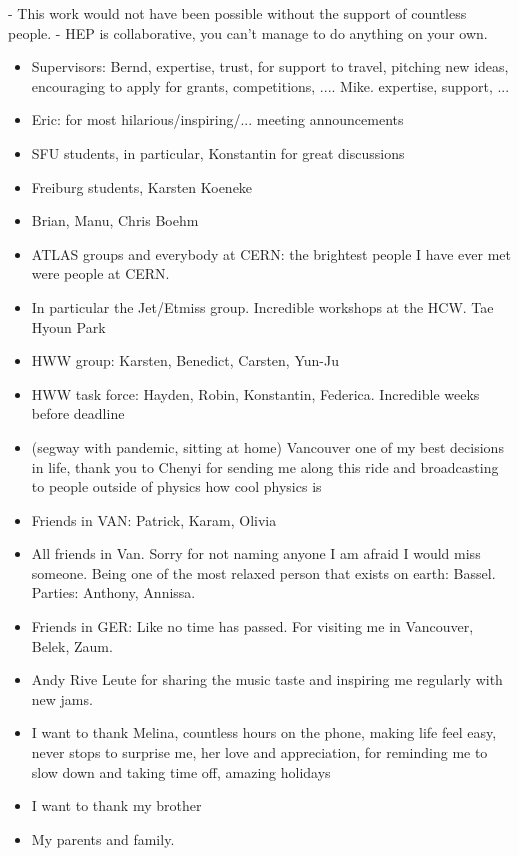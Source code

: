 

- This work would not have been possible without the support of countless people.
- HEP is collaborative, you can't manage to do anything on your own.

\begin{itemize}
    \item Supervisors: Bernd, expertise, trust, for support to travel, pitching new ideas, encouraging to apply for grants, competitions, .... Mike. expertise, support, ...
    \item Eric: for most hilarious/inspiring/... meeting announcements
    \item SFU students, in particular, Konstantin for great discussions
    \item Freiburg students, Karsten Koeneke
    \item Brian, Manu, Chris Boehm
    \item ATLAS groups and everybody at CERN: the brightest people I have ever met were people at CERN.
    \item In particular the Jet/Etmiss group. Incredible workshops at the HCW. Tae Hyoun Park
    \item HWW group: Karsten, Benedict, Carsten, Yun-Ju
    \item HWW task force: Hayden, Robin, Konstantin, Federica. Incredible weeks before deadline
    \item (segway with pandemic, sitting at home) Vancouver one of my best decisions in life, thank you to Chenyi for sending me along this ride and broadcasting to people outside of physics how cool physics is
    \item Friends in VAN: Patrick, Karam, Olivia
    \item All friends in Van. Sorry for not naming anyone I am afraid I would miss someone. Being one of the most relaxed person that exists on earth: Bassel. Parties: Anthony, Annissa.
    \item Friends in GER: Like no time has passed. For visiting me in Vancouver, Belek, Zaum. 
    \item Andy Rive Leute for sharing the music taste and inspiring me regularly with new jams. 
    \item I want to thank Melina, countless hours on the phone, making life feel easy, never stops to surprise me, her love and appreciation, for reminding me to slow down and taking time off, amazing holidays
    \item I want to thank my brother
    \item My parents and family. 
\end{itemize}
